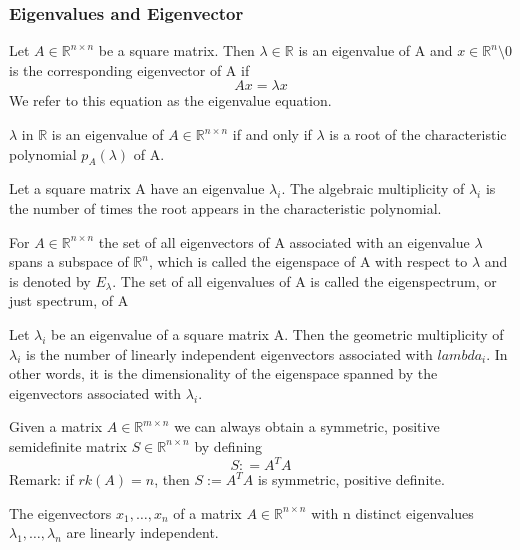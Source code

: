 \subsubsection{Eigenvalues and Eigenvector}
\begin{definition}
    Let $ A \in \mathbb{R}^{n\times n}$ be a square matrix. Then $\lambda \in \mathbb{R}$ is an eigenvalue of A and $x\in \mathbb{R}^n\setminus{0}$ is the corresponding eigenvector of A if
    \[ 
        Ax = \lambda x 
    \]
    We refer to this equation as the eigenvalue equation.
\end{definition}
\begin{theorem}
    $\lambda$ in $\mathbb{R}$ is an eigenvalue of $A \in \mathbb{R}^{n\times n}$ if and only if $\lambda$ is a root of the characteristic polynomial $p_A(\lambda)$ of A.
\end{theorem}
\begin{definition}
    Let a square matrix A have an eigenvalue $\lambda_i$. The algebraic multiplicity of $\lambda_i$ is the number of times the root appears in the characteristic polynomial. 
\end{definition}
\begin{definition}
    For $A \in \mathbb{R}^{n \times n}$ the set of all eigenvectors of A associated with an eigenvalue $\lambda$ spans a subspace of $\mathbb{R}^n$, which is called the eigenspace of A with respect to $\lambda$ and is denoted by $E_\lambda$. The set of all eigenvalues of A is called the eigenspectrum, or just spectrum, of A
\end{definition}
\begin{definition}
    Let $\lambda_i$ be an eigenvalue of a square matrix A. Then the geometric multiplicity of $\lambda_i$ is the number of linearly independent eigenvectors associated with $lambda_i$. In other words, it is the dimensionality of the eigenspace spanned by the eigenvectors associated with $\lambda_i$. 
\end{definition}
\begin{theorem}
    Given a matrix $A \in \mathbb{R}^{m\times n}$ we can always obtain a symmetric, positive semidefinite matrix $S\in \mathbb{R}^{n\times n}$ by defining \[ 
        S : = A^TA 
    \]
    Remark: if $rk(A) = n$, then $S:=A^TA$ is symmetric, positive definite. 
\end{theorem}
\begin{theorem}
    The eigenvectors $x_{1}, \ldots,x_{n}$ of a matrix $A \in \mathbb{R}^{n\times n}$ with n distinct eigenvalues $\lambda_{1}, \ldots,\lambda_{n}$ are linearly independent. 
\end{theorem}
